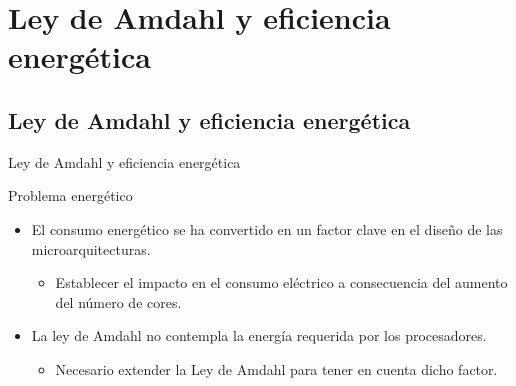 \documentclass[utf8]{beamer}
\begin{document}
\section{Ley de Amdahl y eficiencia energética}

\subsection*{Ley de Amdahl y eficiencia energética}

\begin{frame}{Ley de Amdahl y eficiencia energética}
    \begin{block}{Problema energético}
        \begin{itemize}
            \item El consumo energético se ha convertido en un factor clave en el diseño de las microarquitecturas.
            \begin{itemize}
                \item Establecer el impacto en el consumo eléctrico a consecuencia del aumento del número de cores.
            \end{itemize}
            \item La ley de Amdahl no contempla la energía requerida por los procesadores.
            \begin{itemize}
                \item Necesario extender la Ley de Amdahl para tener en cuenta dicho factor.
            \end{itemize}
        \end{itemize}
    \end{block}
\end{frame}
\end{document}

